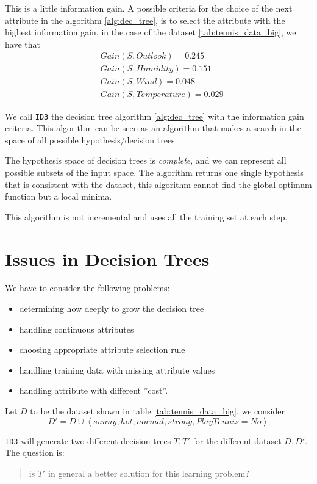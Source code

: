 \documentclass[10pt, letterpaper]{report}
\begin{document}
This is a little information gain. A possible criteria for the choice of the next attribute in the algorithm \ref{alg:dec_tree}, is to select the attribute with the highest information gain, in the case of the dataset \ref{tab:tennis_data_big}, we have that\begin{align}
    &Gain(S,Outlook)=0.245\\
     &Gain(S,Humidity)=0.151\\
      &Gain(S,Wind)=0.048\\
       &Gain(S,Temperature)=0.029
\end{align}

\noindent We call \texttt{ID3} the decision tree algorithm \ref{alg:dec_tree} with the information gain criteria. This algorithm can be seen as an algorithm that makes a search in the space of all possible hypothesis/decision trees.

The hypothesis space of decision trees is \textit{complete}, and we can represent all possible subsets of the input space. The algorithm returns one single hypothesis that is consistent with the dataset, this algorithm cannot find the global optimum function but a local minima.

This algorithm is not incremental and uses all the training set at each step.
\section{Issues in Decision Trees}
We have to consider the following problems:\begin{itemize}
    \item determining how deeply to grow the decision tree
    \item handling continuous attributes
    \item choosing appropriate attribute selection rule 
    \item handling training data with missing attribute values 
    \item handling attribute with different ''cost''.
\end{itemize}

\noindent Let $D$ to be the dataset shown in table \ref{tab:tennis_data_big}, we consider \begin{equation}
    D'=D\cup \left\langle  sunny,hot,normal,strong, PlayTennis=No\right\rangle
\end{equation}

\noindent\texttt{ID3} will generate two different decision trees $T,T'$ for the different dataset $D,D'$. The question is:\begin{quote}
    is $T'$ in general a better solution for this learning problem?
\end{quote}
\end{document}
